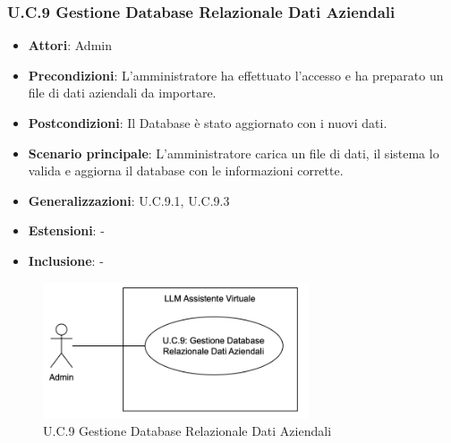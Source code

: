 \subsubsection{U.C.9 Gestione Database Relazionale Dati Aziendali}
\begin{itemize}
    \item \textbf{Attori}: Admin
    \item \textbf{Precondizioni}: L'amministratore ha effettuato l'accesso e ha preparato un file di dati aziendali da importare.
    \item \textbf{Postcondizioni}: Il Database è stato aggiornato con i nuovi dati.
    \item \textbf{Scenario principale}: L'amministratore carica un file di dati, il sistema lo valida e aggiorna il database con le informazioni corrette.
    \item \textbf{Generalizzazioni}: U.C.9.1, U.C.9.3
    \item \textbf{Estensioni}: -
    \item \textbf{Inclusione}: -
\end{itemize}
\begin{figure}[H]
    \centering
    \includegraphics[width=0.7\textwidth]{img/UC9.png}
    \caption{U.C.9 Gestione Database Relazionale Dati Aziendali}
\end{figure}
\newpage

